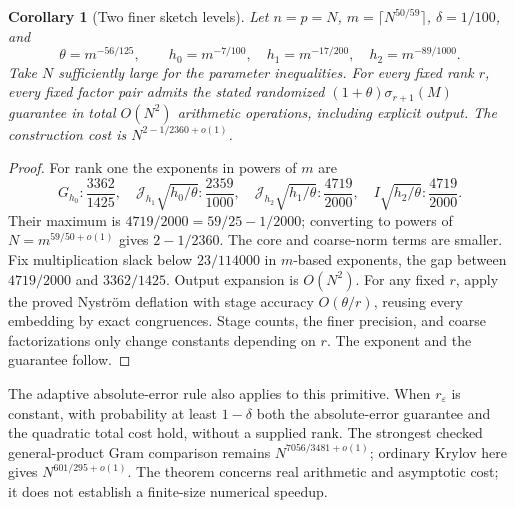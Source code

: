 \documentclass[11pt]{article}
\newtheorem{corollary}[theorem]{Corollary}
\begin{document}
\begin{corollary}[Two finer sketch levels]\label{cor:multilevel}
Let \(n=p=N\), \(m=\lceil N^{50/59}\rceil\), \(\delta=1/100\), and
\[
 \theta=m^{-56/125},\qquad
 h_0=m^{-7/100},\quad h_1=m^{-17/200},\quad h_2=m^{-89/1000}.
\]
Take \(N\) sufficiently large for the parameter inequalities.
For every fixed rank \(r\), every fixed factor pair admits the stated
randomized \((1+\theta)\sigma_{r+1}(M)\) guarantee in total
\(O(N^2)\) arithmetic operations, including explicit output.
The construction cost is \(N^{2-1/2360+o(1)}\).
\end{corollary}
\begin{proof}
For rank one the exponents in powers of \(m\) are
\[
 G_{h_0}:\frac{3362}{1425},\quad
 \mathcal J_{h_1}\sqrt{h_0/\theta}:\frac{2359}{1000},\quad
 \mathcal J_{h_2}\sqrt{h_1/\theta}:\frac{4719}{2000},\quad
 I\sqrt{h_2/\theta}:\frac{4719}{2000}.
\]
Their maximum is \(4719/2000=59/25-1/2000\); converting to
powers of \(N=m^{59/50+o(1)}\) gives \(2-1/2360\).
The core and coarse-norm terms are smaller.
Fix multiplication slack below \(23/114000\) in \(m\)-based exponents,
the gap between \(4719/2000\) and \(3362/1425\).
Output expansion is \(O(N^2)\).
For any fixed \(r\), apply the proved Nystr\"om deflation with stage
accuracy \(O(\theta/r)\), reusing every embedding by exact congruences.
Stage counts, the finer precision, and coarse factorizations only change
constants depending on \(r\). The exponent and the guarantee follow.
\end{proof}

The adaptive absolute-error rule also applies to this primitive.
When \(r_\varepsilon\) is constant, with probability at least \(1-\delta\)
both the absolute-error guarantee and the quadratic total cost hold,
without a supplied rank. The strongest
checked general-product Gram comparison remains
\(N^{7056/3481+o(1)}\); ordinary Krylov here gives
\(N^{601/295+o(1)}\). The theorem concerns real arithmetic and
asymptotic cost; it does not establish a finite-size numerical speedup.
\end{document}
